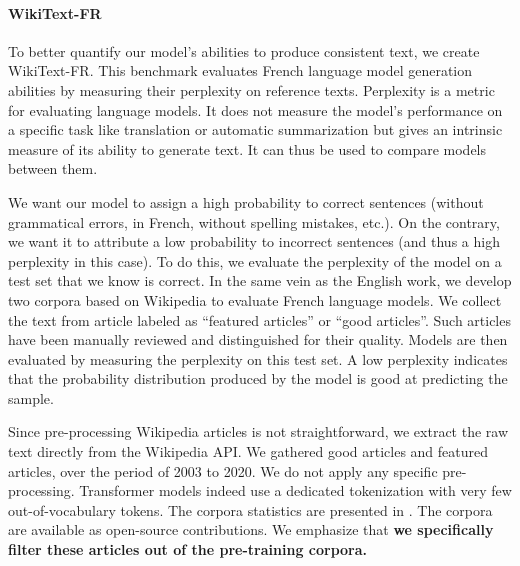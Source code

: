 \paragraph{WikiText-FR} To better quantify our model's abilities to produce consistent text, we create WikiText-FR. This benchmark evaluates French language model generation abilities by measuring their perplexity on reference texts. Perplexity is a metric for evaluating language models. It does not measure the model's performance on a specific task like translation or automatic summarization but gives an intrinsic measure of its ability to generate text. It can thus be used to compare models between them.

We want our model to assign a high probability to correct sentences (without grammatical errors, in French, without spelling mistakes, etc.). On the contrary, we want it to attribute a low probability to incorrect sentences (and thus a high perplexity in this case). To do this, we evaluate the perplexity of the model on a test set that we know is correct. In the same vein as the English work, we develop two corpora based on Wikipedia to evaluate French language models. We collect the text from article labeled as “featured articles” or “good articles”. Such articles have been manually reviewed and distinguished for their quality. Models are then evaluated by measuring the perplexity on this test set. A low perplexity indicates that the probability distribution produced by the model is good at predicting the sample.


Since pre-processing Wikipedia articles is not straightforward, we extract the raw text directly from the Wikipedia API. We gathered  good articles and  featured articles, over the period of 2003 to 2020. We do not apply any specific pre-processing. Transformer models indeed use a dedicated tokenization with very few out-of-vocabulary tokens. The corpora statistics are presented in . The corpora are available as open-source contributions. We emphasize that \textbf{we specifically filter these articles out of the pre-training corpora.}

